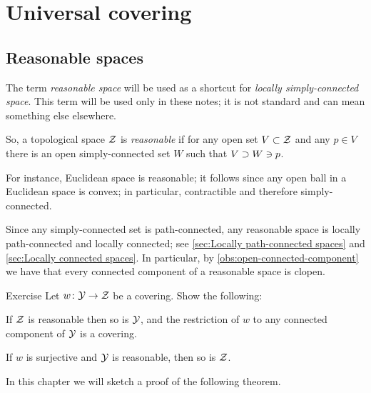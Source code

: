 \chapter{Universal covering}\label{chap:unii-covering}\label{chap:Reasonable spaces}

\section{Reasonable spaces}\label{sec:Reasonable spaces}

The term \emph{reasonable space} will be used as a shortcut for \emph{locally simply-connected space}.
This term will be used only in these notes; it is not standard and can mean something else elsewhere.

So, a topological space $\mathcal{Z}$ is \emph{reasonable} if for any open set $V\subset \mathcal{Z}$ and any $p\in V$ there is an open simply-connected set $W$ such that $V\z\supset W\ni p$.

For instance, Euclidean space is reasonable;
it follows since any open ball in a Euclidean space is convex; in particular, contractible and therefore simply-connected.

Since any simply-connected set is path-connected, any reasonable space is locally path-connected and locally connected;
see \ref{sec:Locally path-connected spaces} and \ref{sec:Locally connected spaces}.
In particular, by \ref{obs:open-connected-component} we have that every connected component of a reasonable space is clopen.


\begin{thm}[!]{Exercise}\label{ex:reasonable}
Let $w\colon\mathcal{Y}\to \mathcal{Z}$ be a covering.
Show the following:
\begin{subthm}{}
If $\mathcal{Z}$ is reasonable then so is $\mathcal{Y}$, and the restriction of $w$ to any connected component of $\mathcal{Y}$ is a covering.
\end{subthm}

\begin{subthm}{}
If $w$ is surjective and $\mathcal{Y}$ is reasonable, then so is $\mathcal{Z}$.
\end{subthm}

\end{thm}

In this chapter we will sketch a proof of the following theorem.

\begin{figure}
\vskip-8mm
\centering
{}
\end{figure}

